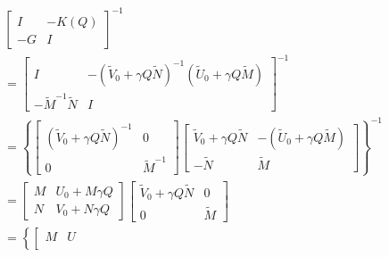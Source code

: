 \documentclass[journal]{IEEEtran}
\begin{document}
\begin{equation}
  \begin{aligned}
     & \left[\begin{array}{cc}
        I  & -K(Q) \\
        -G & I
      \end{array}\right]^{-1}                                                                                                                                                              \\
     & =\left[\begin{array}{cc}
        I                         & -(\tilde{V}_{0}+\gamma Q \tilde{N})^{-1} (\tilde{U}_{0}+\gamma Q \tilde{M}) \\
        -\tilde{M}^{-1} \tilde{N} & I
      \end{array}\right]^{-1}                                                                                                                                                             \\
     & =\left\{\left[\begin{array}{cc}
        (\tilde{V}_{0}+\gamma Q \tilde{N})^{-1} & 0              \\
        0                                       & \tilde{M}^{-1}
      \end{array}\right]\left[\begin{array}{cc}
        \tilde{V}_{0}+\gamma Q \tilde{N} & -(\tilde{U}_{0}+\gamma Q \tilde{M}) \\
        -\tilde{N}                       & \tilde{M}
      \end{array}\right]\right\}^{-1}                                                                                                   \\
     & =\left[\begin{array}{cc}
        M & U_{0}+M \gamma Q \\
        N & V_{0}+N \gamma Q
      \end{array}\right]\left[\begin{array}{cc}
        \tilde{V}_{0}+\gamma Q \tilde{N} & 0         \\
        0                                & \tilde{M}
      \end{array}\right]                                                                                                                       \\
     & =\left\{\left[\begin{array}{ll}
        M & U \\

\end{array}
\end{aligned}
\end{equation}
\end{document}
